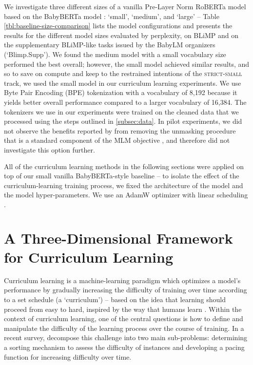 We investigate three different sizes of a vanilla Pre-Layer Norm RoBERTa model \cite{liu2019roberta} based on the BabyBERTa model \cite{huebner2021babyberta}: `small', `medium', and `large' -- Table \ref{tbl:baseline-size-comparison} lists the model configurations and presents the results for the different model sizes evaluated by perplexity, on BLiMP \cite{warstadt2020blimp} and on the supplementary BLiMP-like tasks issued by the BabyLM organizers (`Blimp.Supp'). We found the medium model with a small vocabulary size performed the best overall; however, the small model achieved similar results, and so to save on compute and keep to the restrained intentions of the \textsc{strict-small} track, we used the small model in our curriculum learning experiments.
We use Byte Pair Encoding (BPE) tokenization \cite{gage1994bpe} with a vocabulary of 8,192 because it yields better overall performance compared to a larger vocabulary of 16,384. The tokenizers we use in our experiments were trained on the cleaned data that we processed using the steps outlined in \ref{subsec:data}. In pilot experiments, we did not observe the benefits reported by \citet{huebner2021babyberta} from removing the unmasking procedure that is a standard component of the MLM objective \cite{devlin2019bert}, and therefore did not investigate this option further.

All of the curriculum learning methods in the following sections were applied on top of our small vanilla BabyBERTa-style baseline -- to isolate the effect of the curriculum-learning training process, we fixed the architecture of the model and the model hyper-parameters. We use an AdamW optimizer with linear scheduling \cite{loshchilov2019decoupled}.

\section{A Three-Dimensional Framework for Curriculum Learning}
Curriculum learning \cite{bengio2009curriculum} is a machine-learning paradigm which optimizes a model's performance by gradually increasing the difficulty of training over time according to a set schedule (a `curriculum') -- based on the idea that learning should proceed from easy to hard, inspired by the way that humans learn \cite{elman1993learning}.
Within the context of curriculum learning, one of the central questions is how to define and manipulate the difficulty of the learning process over the course of training. In a recent survey, \citet{soviany2022curriculum} decompose this challenge into two main sub-problems: determining a sorting mechanism to assess the difficulty of instances and developing a pacing function for increasing difficulty over time. 

